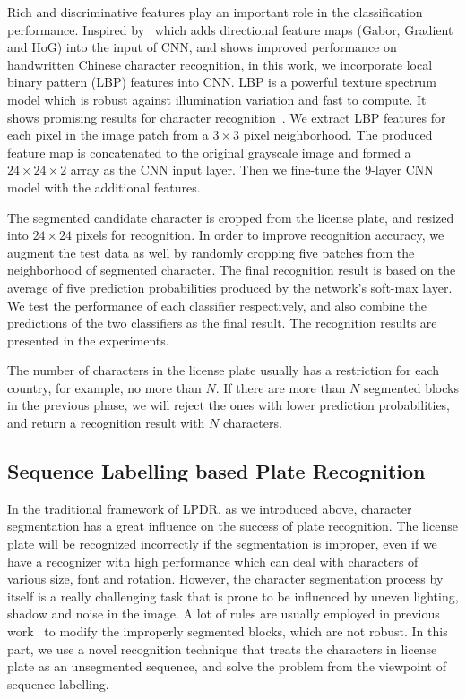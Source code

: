 \documentclass[twocolumn]{svjour3}
\begin{document}
Rich and discriminative features play an important role in the classification performance. Inspired by~\cite{Zhong2015High} which adds directional feature maps (Gabor, Gradient and HoG) into the input of CNN, and shows improved performance on handwritten Chinese character recognition, in this work, we incorporate local binary pattern (LBP) features into CNN. LBP is a powerful texture spectrum model which is robust against illumination variation and fast to compute. It shows promising results for character recognition~\cite{Hsu2013,Chen2011LBP}.
We extract LBP features for each pixel in the image patch from a $3 \times 3$ pixel neighborhood. The produced feature map is concatenated to the original grayscale image and formed a $24 \times 24 \times 2$ array as the CNN input layer. Then we fine-tune the $9$-layer CNN model with the additional features. %

The segmented candidate character is cropped from the license plate, and resized into $24 \times 24$ pixels for recognition. In order to improve recognition accuracy, we augment the test data as well by randomly cropping five patches from the neighborhood of segmented character. The final recognition result is based on the average of five prediction probabilities produced by the network's soft-max layer. We test the performance of each classifier respectively, and also combine the predictions of the two classifiers as the final result. The recognition results are presented in the experiments.

The number of characters in the license plate usually has a restriction for each country, for example, no more than $N$. If there are more than $N$ segmented blocks in the previous phase, we will reject the ones with lower prediction probabilities, and return a recognition result with $N$ characters.

\subsection{Sequence Labelling based Plate Recognition}\label{sec:Sequence}
In the traditional framework of LPDR, as we introduced above, character segmentation has a great influence on the success of plate recognition. The license plate will be recognized incorrectly if the segmentation is improper, even if we have a recognizer with high performance which can deal with characters of various size, font and rotation. However, the character segmentation process by itself is a really challenging task that is prone to be influenced by uneven lighting, shadow and noise in the image. A lot of rules are usually employed in previous work~\cite{Yoon2011,Zheng2013An,Hsu2013} to modify the improperly segmented blocks, which are not robust. In this part, we use a novel recognition technique that treats the characters in license plate as an unsegmented sequence, and solve the problem from the viewpoint of sequence labelling.
\end{document}
